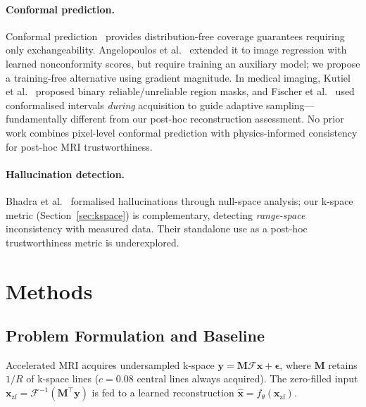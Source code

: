 \documentclass[runningheads]{llncs}
\begin{document}
\paragraph{Conformal prediction.} Conformal prediction~\cite{shafer2008tutorial,angelopoulos2023gentle} provides distribution-free coverage guarantees requiring only exchangeability. Angelopoulos et al.~\cite{angelopoulos2022image} extended it to image regression with learned nonconformity scores, but require training an auxiliary model; we propose a training-free alternative using gradient magnitude. In medical imaging, Kutiel et al.~\cite{kutiel2023masks} proposed binary reliable/unreliable region masks, and Fischer et al.~\cite{fischer2025cute} used conformalised intervals \emph{during} acquisition to guide adaptive sampling---fundamentally different from our post-hoc reconstruction assessment. No prior work combines pixel-level conformal prediction with physics-informed consistency for post-hoc MRI trustworthiness.

\paragraph{Hallucination detection.} Bhadra et al.~\cite{bhadra2021hallucinations} formalised hallucinations through null-space analysis; our k-space metric (Section~\ref{sec:kspace}) is complementary, detecting \emph{range-space} inconsistency with measured data. Their standalone use as a post-hoc trustworthiness metric is underexplored.

\section{Methods}

\subsection{Problem Formulation and Baseline}

Accelerated MRI acquires undersampled k-space $\mathbf{y} = \mathbf{M}\mathcal{F}\mathbf{x} + \boldsymbol{\epsilon}$, where $\mathbf{M}$ retains $1/R$ of k-space lines ($c{=}0.08$ central lines always acquired). The zero-filled input $\mathbf{x}_\text{zf} = \mathcal{F}^{-1}(\mathbf{M}^\top \mathbf{y})$ is fed to a learned reconstruction $\hat{\mathbf{x}} = f_\theta(\mathbf{x}_\text{zf})$.
\end{document}
